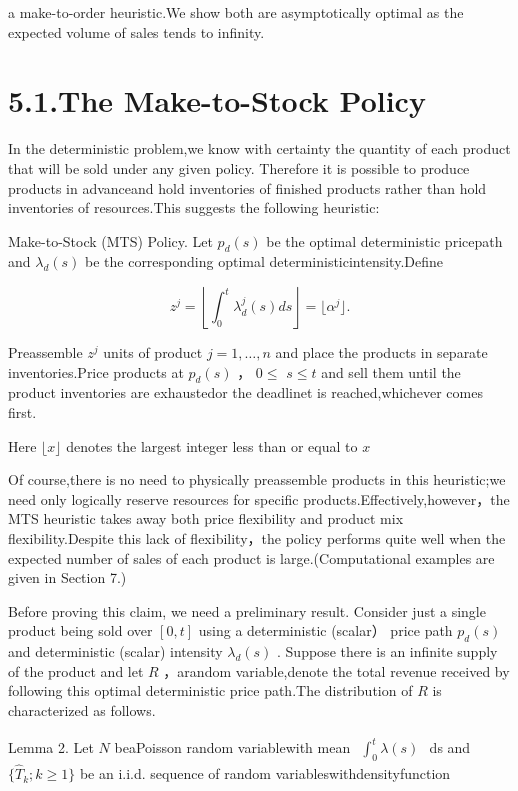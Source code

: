 a make-to-order heuristic.We show both are asymptotically optimal as the
expected volume of sales tends to infinity.

\section{5.1.The Make-to-Stock Policy}\label{the-make-to-stock-policy}

In the deterministic problem,we know with certainty the quantity of each
product that will be sold under any given policy. Therefore it is
possible to produce products in advanceand hold inventories of finished
products rather than hold inventories of resources.This suggests the
following heuristic:

Make-to-Stock (MTS) Policy. Let \(p _ { d } ( s )\) be the optimal
deterministic pricepath and \(\lambda _ { d } ( s )\) be the
corresponding optimal deterministicintensity.Define

\[
z ^ { j } = \left\lfloor \int _ { 0 } ^ { t } \lambda _ { d } ^ { j } ( s ) d s \right\rfloor = \lfloor \alpha ^ { j } \rfloor .
\]

Preassemble \(z ^ { j }\) units of product \(j = 1 , \ldots , n\) and
place the products in separate inventories.Price products at
\(p _ { d } ( s )\) ， \(0 \leqslant\) \(s \leqslant t\) and sell them
until the product inventories are exhaustedor the deadlinet is
reached,whichever comes first.

Here \(\lfloor x \rfloor\) denotes the largest integer less than or
equal to \(x\)

Of course,there is no need to physically preassemble products in this
heuristic;we need only logically reserve resources for specific
products.Effectively,however，the MTS heuristic takes away both price
flexibility and product mix flexibility.Despite this lack of
flexibility，the policy performs quite well when the expected number of
sales of each product is large.(Computational examples are given in
Section 7.)

Before proving this claim, we need a preliminary result. Consider just a
single product being sold over \([ 0 , t ]\) using a deterministic
(scalar） price path \(p _ { d } ( s )\) and deterministic (scalar)
intensity \(\lambda _ { d } ( s )\) . Suppose there is an infinite
supply of the product and let \(R\) ，arandom variable,denote the total
revenue received by following this optimal deterministic price path.The
distribution of \(R\) is characterized as follows.

Lemma 2. Let \(N\) beaPoisson random variablewith mean
\(\begin{array} { r } { \int _ { 0 } ^ { t } \lambda ( s ) } \end{array}\)
ds and \(\{ \hat { T } _ { k } ; k \ge 1 \}\) be an i.i.d. sequence of
random variableswithdensityfunction

